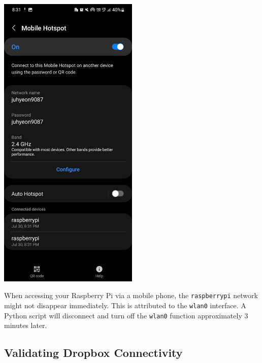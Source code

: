 \documentclass[
  letterpaper,
]{scrbook}
\begin{document}
\includegraphics[width=0.5\textwidth,height=\textheight]{content/material/ch2/check_hotspot.jpg}

\begin{tcolorbox}[enhanced jigsaw, left=2mm, coltitle=black, colframe=quarto-callout-note-color-frame, bottomrule=.15mm, colback=white, bottomtitle=1mm, breakable, colbacktitle=quarto-callout-note-color!10!white, titlerule=0mm, toptitle=1mm, arc=.35mm, rightrule=.15mm, opacityback=0, title=\textcolor{quarto-callout-note-color}{\faInfo}\hspace{0.5em}{Note}, toprule=.15mm, leftrule=.75mm, opacitybacktitle=0.6]

When accessing your Raspberry Pi via a mobile phone, the
\texttt{raspberrypi} network might not disappear immediately. This is
attributed to the \texttt{wlan0} interface. A Python script will
disconnect and turn off the \texttt{wlan0} function approximately 3
minutes later.

\end{tcolorbox}

\hypertarget{validating-dropbox-connectivity}{%
\subsection{Validating Dropbox
Connectivity}\label{validating-dropbox-connectivity}}
\end{document}
